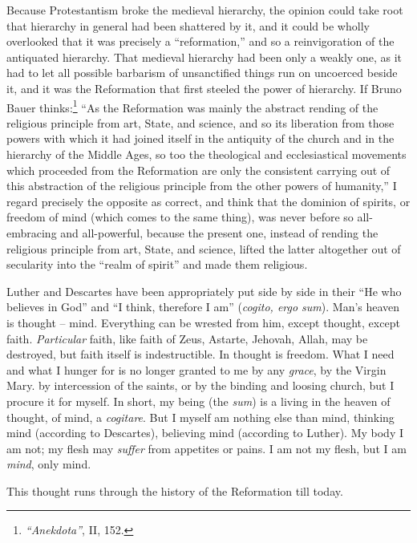 \documentclass[12pt,a4paper]{book}
\begin{document}
Because Protestantism broke the medieval hierarchy, the opinion could take 
root that hierarchy in general had been shattered by it, and it could be 
wholly overlooked that it was precisely a ``reformation,'' and so a 
reinvigoration of the antiquated hierarchy. That medieval hierarchy had been 
only a weakly one, as it had to let all possible barbarism of unsanctified 
things run on uncoerced beside it, and it was the Reformation that first 
steeled the power of hierarchy. If Bruno Bauer 
thinks:\footnote{\textit{``Anekdota''}, II, 152.} ``As the Reformation was 
mainly the abstract rending of the religious principle from art, State, and 
science, and so its liberation from those powers with which it had joined 
itself in the antiquity of the church and in the hierarchy of the Middle Ages, 
so too the theological and ecclesiastical movements which proceeded from the 
Reformation are only the consistent carrying out of this abstraction of the 
religious principle from the other powers of humanity,'' I regard precisely 
the opposite as correct, and think that the dominion of spirits, or freedom of 
mind (which comes to the same thing), was never before so all-embracing and 
all-powerful, because the present one, instead of rending the religious 
principle from art, State, and science, lifted the latter altogether out of 
secularity into the ``realm of spirit'' and made them religious.

Luther and Descartes have been appropriately put side by side in their ``He 
who believes in God'' and ``I think, therefore I am'' (\textit{cogito, ergo 
sum}). Man's heaven is thought -- mind. Everything can be wrested from him, 
except thought, except faith. \textit{Particular} faith, like faith of Zeus, 
Astarte, Jehovah, Allah, may be destroyed, but faith itself is indestructible. 
In thought is freedom. What I need and what I hunger for is no longer granted 
to me by any \textit{grace}, by the Virgin Mary. by intercession of the 
saints, or by the binding and loosing church, but I procure it for myself. In 
short, my being (the \textit{sum}) is a living in the heaven of thought, of 
mind, a \textit{cogitare}. But I myself am nothing else than mind, thinking 
mind (according to Descartes), believing mind (according to Luther). My body I 
am not; my flesh may \textit{suffer} from appetites or pains. I am not my 
flesh, but I am \textit{mind}, only mind.

This thought runs through the history of the Reformation till today.
\end{document}
